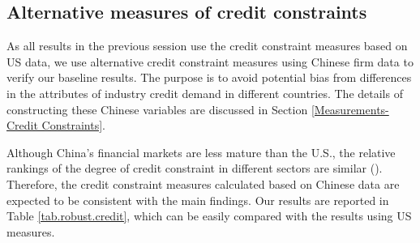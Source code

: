 \documentclass[12pt]{article}
\begin{document}
\subsection{Alternative measures of credit constraints}

As all results in the previous session use the credit constraint measures based on US data, we use alternative credit constraint measures using Chinese firm data to verify our baseline results. The purpose is to avoid potential bias from differences in the attributes of industry credit demand in different countries. The details of constructing these Chinese variables are discussed in Section \ref{Measurements-Credit Constraints}. 

Although China's financial markets are less mature than the U.S., the relative rankings of the degree of credit constraint in different sectors are similar (\cite{manova2013}). Therefore, the credit constraint measures calculated based on Chinese data are expected to be consistent with the main findings. Our results are reported in Table \ref{tab.robust.credit}, which can be easily compared with the results using US measures.
\end{document}
